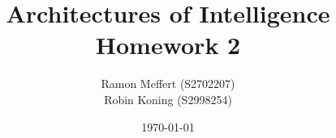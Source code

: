 \documentclass[11pt,a4paper,titlepage]{article}
\title{Architectures of Intelligence \\ Homework 2}
\author{Ramon Meffert (S2702207) \\ Robin Koning (S2998254)}
\date{\today}
\begin{document}
\maketitle{}
\newpage
\end{document}
